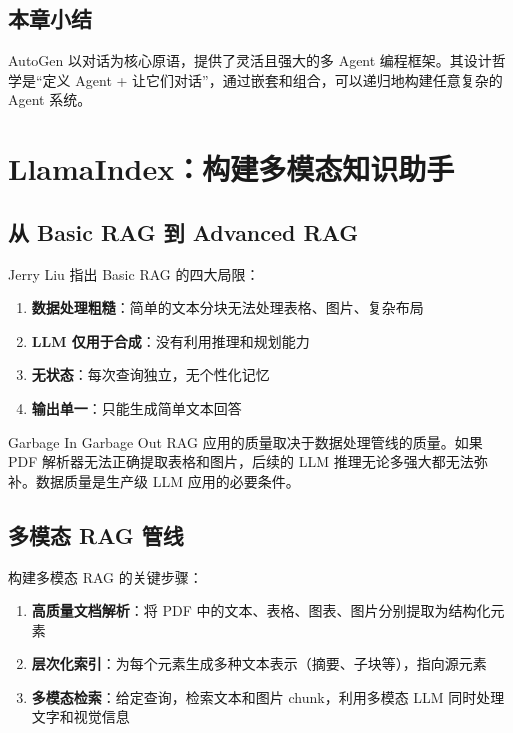 \documentclass[a4paper]{article}
\begin{document}
\subsection{本章小结}

AutoGen 以对话为核心原语，提供了灵活且强大的多 Agent 编程框架。其设计哲学是``定义 Agent + 让它们对话''，通过嵌套和组合，可以递归地构建任意复杂的 Agent 系统。

\section{LlamaIndex：构建多模态知识助手}

\subsection{从 Basic RAG 到 Advanced RAG}

Jerry Liu 指出 Basic RAG 的四大局限：
\begin{enumerate}
    \item \textbf{数据处理粗糙}：简单的文本分块无法处理表格、图片、复杂布局
    \item \textbf{LLM 仅用于合成}：没有利用推理和规划能力
    \item \textbf{无状态}：每次查询独立，无个性化记忆
    \item \textbf{输出单一}：只能生成简单文本回答
\end{enumerate}

\begin{warningbox}{Garbage In Garbage Out}
RAG 应用的质量取决于数据处理管线的质量。如果 PDF 解析器无法正确提取表格和图片，后续的 LLM 推理无论多强大都无法弥补。数据质量是生产级 LLM 应用的必要条件。
\end{warningbox}

\subsection{多模态 RAG 管线}

构建多模态 RAG 的关键步骤：

\begin{enumerate}
    \item \textbf{高质量文档解析}：将 PDF 中的文本、表格、图表、图片分别提取为结构化元素
    \item \textbf{层次化索引}：为每个元素生成多种文本表示（摘要、子块等），指向源元素
    \item \textbf{多模态检索}：给定查询，检索文本和图片 chunk，利用多模态 LLM 同时处理文字和视觉信息
\end{enumerate}
\end{document}
